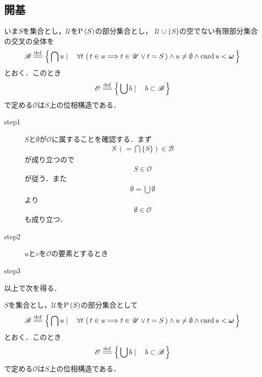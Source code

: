 \subsection{開基}
	いま$S$を集合とし，$\mathscr{U}$を$\operatorname*{P} \left(S\right)$の部分集合とし，
	$\mathscr{U} \cup \{S\}$の空でない有限部分集合の交叉の全体を
	\begin{align}
		\mathscr{B} \defeq \Set{\bigcap u}{
		\forall t\, \left(\, t \in u \Longrightarrow t \in \mathscr{U} \vee t = S\, \right) \wedge u \neq \emptyset \wedge \card{u} < \Natural}
	\end{align}
	とおく．このとき
	\begin{align}
		\mathscr{O} \defeq \Set{\bigcup b}{b \subset \mathscr{B}}
	\end{align}
	で定める$\mathscr{O}$は$S$上の位相構造である．
	
	\begin{description}
		\item[step1]
			$S$と$\emptyset$が$\mathscr{O}$に属することを確認する．まず
			\begin{align}
				S\ (= \bigcap \{S\}) \in \mathscr{B}
			\end{align}
			が成り立つので
			\begin{align}
				S \in \mathscr{O}
			\end{align}
			が従う．また
			\begin{align}
				\emptyset = \bigcup \emptyset		
			\end{align}
			より
			\begin{align}
				\emptyset \in \mathscr{O}
			\end{align}
			も成り立つ．
		
		\item[step2]
			$u$と$v$を$\mathscr{O}$の要素とするとき
			
		\item[step3]
			
	\end{description}
	
	以上で次を得る．
	
	\begin{screen}
		\begin{thm}[位相の生成]
			$S$を集合とし，$\mathscr{U}$を$\operatorname*{P} \left(S\right)$の部分集合として
			\begin{align}
				\mathscr{B} \defeq \Set{\bigcap u}{
				\forall t\, \left(\, t \in u \Longrightarrow t \in \mathscr{U} \vee t = S\, \right) \wedge u \neq \emptyset \wedge \card{u} < \Natural}
			\end{align}
			とおく．このとき
			\begin{align}
				\mathscr{O} \defeq \Set{\bigcup b}{b \subset \mathscr{B}}
			\end{align}
			で定める$\mathscr{O}$は$S$上の位相構造である．
		\end{thm}
	\end{screen}
	
